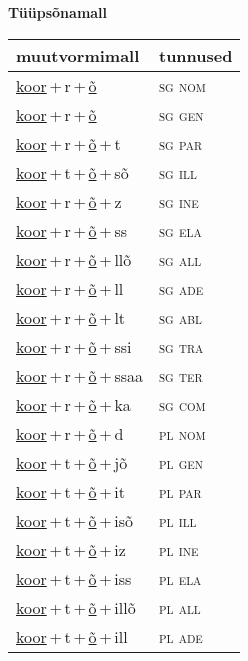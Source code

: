
\vspace{1.8em}
\begin{minipage}{\textwidth}
\textbf{Tüüpsõnamall \,}\\

\begin{sideways}
\begin{tabular}{l l}
muutvormimall & tunnused \\
\hline
\underline{koor}\,+\,r\,+\,\underline{õ} & \textsc{ sg nom } \\
\underline{koor}\,+\,r\,+\,\underline{õ} & \textsc{ sg gen } \\
\underline{koor}\,+\,r\,+\,\underline{õ}\,+\,t & \textsc{ sg par } \\
\underline{koor}\,+\,t\,+\,\underline{õ}\,+\,sõ & \textsc{ sg ill } \\
\underline{koor}\,+\,r\,+\,\underline{õ}\,+\,z & \textsc{ sg ine } \\
\underline{koor}\,+\,r\,+\,\underline{õ}\,+\,ss & \textsc{ sg ela } \\
\underline{koor}\,+\,r\,+\,\underline{õ}\,+\,llõ & \textsc{ sg all } \\
\underline{koor}\,+\,r\,+\,\underline{õ}\,+\,ll & \textsc{ sg ade } \\
\underline{koor}\,+\,r\,+\,\underline{õ}\,+\,lt & \textsc{ sg abl } \\
\underline{koor}\,+\,r\,+\,\underline{õ}\,+\,ssi & \textsc{ sg tra } \\
\underline{koor}\,+\,r\,+\,\underline{õ}\,+\,ssaa & \textsc{ sg ter } \\
\underline{koor}\,+\,r\,+\,\underline{õ}\,+\,ka & \textsc{ sg com } \\
\underline{koor}\,+\,r\,+\,\underline{õ}\,+\,d & \textsc{ pl nom } \\
\underline{koor}\,+\,t\,+\,\underline{õ}\,+\,jõ & \textsc{ pl gen } \\
\underline{koor}\,+\,t\,+\,\underline{õ}\,+\,it & \textsc{ pl par } \\
\underline{koor}\,+\,t\,+\,\underline{õ}\,+\,isõ & \textsc{ pl ill } \\
\underline{koor}\,+\,t\,+\,\underline{õ}\,+\,iz & \textsc{ pl ine } \\
\underline{koor}\,+\,t\,+\,\underline{õ}\,+\,iss & \textsc{ pl ela } \\
\underline{koor}\,+\,t\,+\,\underline{õ}\,+\,illõ & \textsc{ pl all } \\
\underline{koor}\,+\,t\,+\,\underline{õ}\,+\,ill & \textsc{ pl ade } \\

\end{tabular}
\end{sideways}
\end{minipage}
